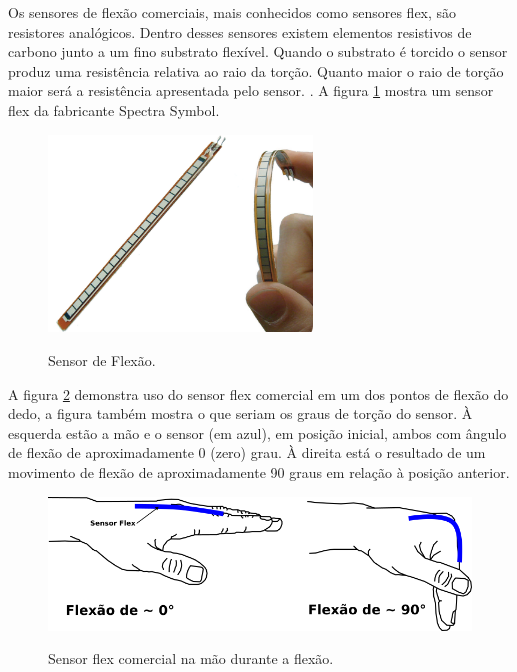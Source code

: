 \documentclass[
	12pt,				%
	openright,			%
	oneside,			%
	a4paper,			%
	english,			%
	brazil				%
	]{abntex2}
\begin{document}
		Os sensores de flexão comerciais, mais conhecidos como sensores flex, são resistores analógicos. Dentro desses sensores existem elementos resistivos de carbono junto a um fino substrato flexível. Quando o substrato é torcido o sensor produz uma resistência relativa ao raio da torção. Quanto maior o raio de torção maior será a resistência apresentada pelo sensor. \cite{solanki2013sign}. A figura \ref{Fig:flex-sensor1} mostra um sensor flex da fabricante Spectra Symbol.

	\begin{figure}[!h]
		\centering
		\caption{Sensor de Flexão.}
		\includegraphics[width=7cm,keepaspectratio=true]{./figures/flex-sensor1.png}
		\label{Fig:flex-sensor1}
	\end{figure}


		A figura \ref{Fig:hand-flexsensor-degrees1} demonstra uso do sensor flex comercial em um dos pontos de flexão do dedo, a figura também mostra o que seriam os graus de torção do sensor. À esquerda estão a mão e o sensor (em azul), em posição inicial, ambos com ângulo de flexão de aproximadamente 0 (zero) grau. À direita está o resultado de um movimento de flexão de aproximadamente 90 graus em relação à posição anterior.


	\begin{figure}[!h]
		\centering
		\caption{Sensor flex comercial na mão durante a flexão.}
		\includegraphics[width=13cm,keepaspectratio=true]{./figures/hand-flexsensor-degrees1.png}
		\label{Fig:hand-flexsensor-degrees1}
	\end{figure}
\end{document}
